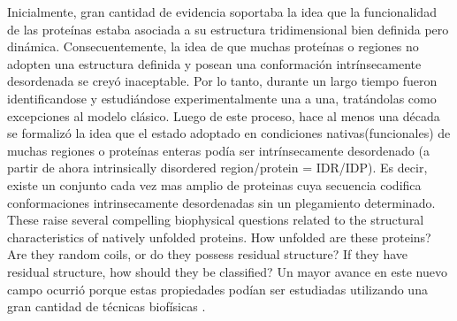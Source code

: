 Inicialmente, gran cantidad de evidencia soportaba la idea que la funcionalidad de las proteínas estaba asociada a su estructura tridimensional bien definida pero dinámica.
Consecuentemente, la idea de que muchas proteínas o regiones no adopten una estructura definida y posean una conformación intrínsecamente desordenada se creyó inaceptable. 
Por lo tanto, durante un largo tiempo fueron identificandose y estudiándose experimentalmente una a una, tratándolas como excepciones al modelo clásico.
Luego de este proceso, hace al menos una década se formalizó la idea que el estado adoptado en condiciones nativas(funcionales) de muchas regiones o proteínas enteras podía ser intrínsecamente desordenado
(a partir de ahora intrinsically disordered region/protein = IDR/IDP).
Es decir, existe un conjunto cada vez mas amplio de proteinas cuya secuencia codifica conformaciones intrinsecamente desordenadas sin un plegamiento determinado.
These raise several compelling biophysical questions related to the structural characteristics of natively unfolded proteins. 
How unfolded are these proteins? Are they random coils, or do they possess residual structure? If they have residual structure, how should they be classified?
Un mayor avance en este nuevo campo ocurrió porque estas propiedades podían ser estudiadas utilizando una gran cantidad de técnicas biofísicas \cite{eliezer2009biophysical}.

